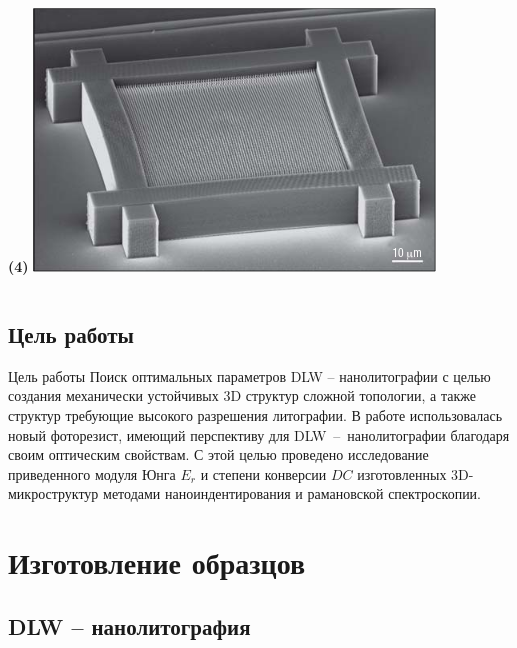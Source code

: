 \documentclass[aspectratio=169]{beamer}
\begin{document}
\begin{frame}
\begin{columns}[c]
{    \hfill
    \begin{minipage}[t]{0.45 \textwidth}
        \textbf{(4)} \includegraphics[width = \linewidth]{fig/Screenshot_2021-10-04 nmat1155 - 259 pdf.png}
    \end{minipage}
}
\end{columns}
\end{frame}


\subsection{Цель работы}

\begin{frame}{Цель работы}
       Поиск оптимальных параметров DLW -- нанолитографии с целью создания механически устойчивых 3D структур сложной топологии, а также структур требующие высокого разрешения литографии. В работе использовалась новый фоторезист, имеющий перспективу для DLW~--~нанолитографии благодаря своим оптическим свойствам. С этой целью проведено исследование приведенного модуля Юнга $E_r$ и степени конверсии $DC$ изготовленных 3D-микроструктур методами наноиндентирования и рамановской спектроскопии. 
\end{frame}

\section{Изготовление образцов} 

\subsection{DLW -- нанолитография}
\end{document}
